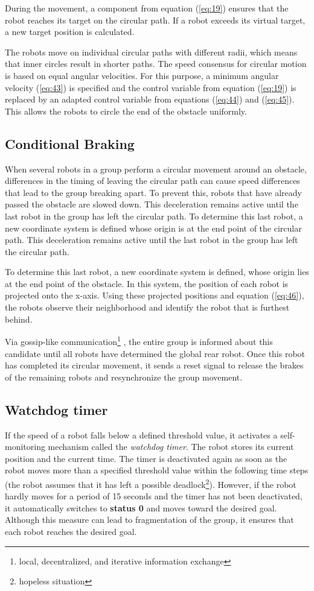 \documentclass[conference]{IEEEtran}
\begin{document}
During the movement, a component from equation (\eqref{eq:19}) ensures that the robot 
reaches its target on the circular path. If a robot exceeds its 
virtual target, a new target position is calculated.

The robots move on individual circular paths with 
different radii, which means that inner circles result in shorter paths. 
The speed consensus for circular motion is based on equal 
angular velocities. For this purpose, a minimum angular velocity (\eqref{eq:43}) 
is specified and the control variable from equation (\eqref{eq:19}) is replaced by an 
adapted control variable 
from equations (\eqref{eq:44}) and (\eqref{eq:45}). 
This allows the robots to circle the end of the obstacle uniformly.

\subsection*{Conditional Braking}
When several robots in a group perform a circular movement around an obstacle,
 differences in the timing of leaving the circular path can cause speed differences 
 that lead to the group breaking apart.
To prevent this, robots that have already passed the obstacle are slowed down.
This deceleration remains active until the last robot in the group has left the circular path.
To determine this last robot, a new coordinate system is defined whose origin is at the 
end point of the circular path. This deceleration remains active until the last robot in the 
group has left the circular path.

To determine this last robot, a new coordinate system is defined, 
whose origin lies at the end point of the obstacle. In this system, the 
position of each robot is projected onto the x-axis. Using these projected 
positions and equation (\eqref{eq:46}), the robots observe their neighborhood and 
identify the robot that is furthest behind.

Via gossip-like 
communication\footnote{local, decentralized, and iterative information exchange}
, the entire group is informed about this candidate until 
all robots have determined the global rear robot. Once 
this robot has completed its circular movement, it sends a reset signal to 
release the brakes of the remaining robots and resynchronize the group movement.

\subsection*{Watchdog timer}
If the speed of a robot falls below a defined threshold value, 
it activates a self-monitoring mechanism called the \textit{watchdog timer}. 
The robot stores its current position and the current time. 
The timer is deactivated again as soon as the robot moves more than a specified threshold 
value within the following time steps 
(the robot assumes that it has left a possible deadlock\footnote{hopeless situation}). 
However, if the robot hardly moves for a period of 15 seconds 
and the timer has not been deactivated, it automatically switches to \textbf{status 0} 
and moves toward the desired goal. Although this measure can lead to 
fragmentation of the group, it ensures that each robot 
reaches the desired goal.
\end{document}
